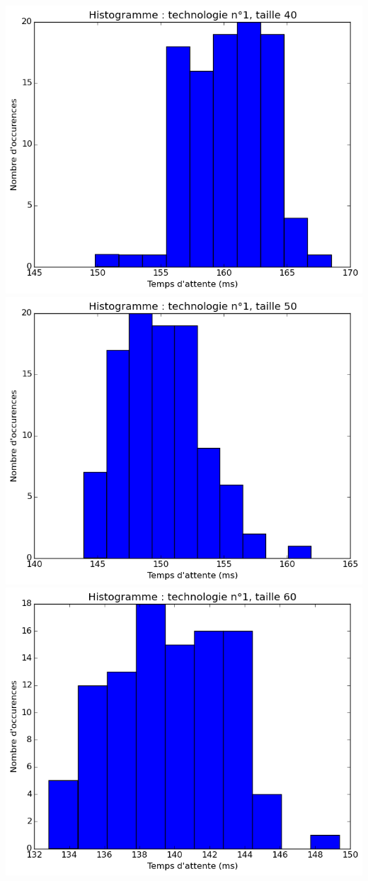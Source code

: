 \documentclass[a4paper,10pt]{article}
\begin{document}
\includegraphics[scale=0.4]{img/1-40.png}
\\
\includegraphics[scale=0.4]{img/1-50.png}
\includegraphics[scale=0.4]{img/1-60.png}
\end{document}
